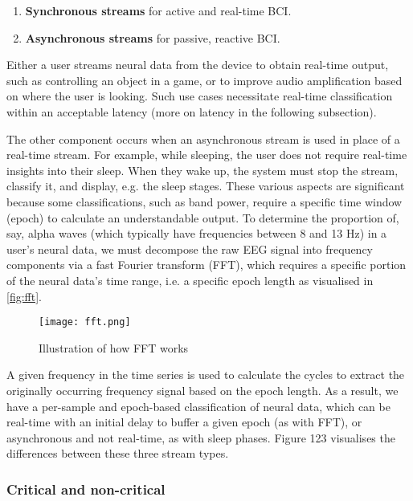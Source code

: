 \begin{enumerate}
  \item \textbf{Synchronous streams} for active and real-time BCI.
  \item \textbf{Asynchronous streams} for passive, reactive BCI.
\end{enumerate}

Either a user streams neural data from the device to obtain real-time output, such as controlling an object in a game, or to improve audio amplification based on where the user is looking. Such use cases necessitate real-time classification within an acceptable latency (more on latency in the following subsection).

The other component occurs when an asynchronous stream is used in place of a real-time stream. For example, while sleeping, the user does not require real-time insights into their sleep. When they wake up, the system must stop the stream, classify it, and display, e.g. the sleep stages. These various aspects are significant because some classifications, such as band power, require a specific time window (epoch) to calculate an understandable output. To determine the proportion of, say, alpha waves (which typically have frequencies between 8 and 13 Hz) in a user's neural data, we must decompose the raw EEG signal into frequency components via a fast Fourier transform (FFT), which requires a specific portion of the neural data's time range, i.e. a specific epoch length as visualised in \autoref{fig:fft}.

\begin{figure}[!ht]
  \centering
  \texttt{[image: fft.png]}
  \caption[Illustration of how FFT works]{Illustration of how FFT works \citep{3blue1brown_but_2018}}
  \label{fig:fft}
\end{figure}

A given frequency in the time series is used to calculate the cycles to extract the originally occurring frequency signal based on the epoch length. As a result, we have a per-sample and epoch-based classification of neural data, which can be real-time with an initial delay to buffer a given epoch (as with FFT), or asynchronous and not real-time, as with sleep phases. Figure 123 visualises the differences between these three stream types.


\subsubsection{Critical and non-critical}
\label{chapter5-critical-and-non-critical}

